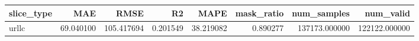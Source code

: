 \begin{tabular}{lrrrrrrr}
\toprule
slice_type & MAE & RMSE & R2 & MAPE & mask_ratio & num_samples & num_valid \\
\midrule
urllc & 69.040100 & 105.417694 & 0.201549 & 38.219082 & 0.890277 & 137173.000000 & 122122.000000 \\
\bottomrule
\end{tabular}

